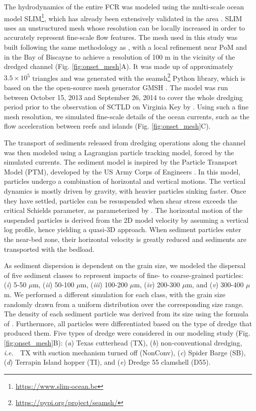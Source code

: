 \documentclass[preprint,12pt,authoryear]{elsarticle}
\newcommand{\ie}{{\it i.e.}\ }
\begin{document}
The hydrodynamics of the entire FCR was modeled using the multi-scale ocean model SLIM\footnote{\url{ https://www.slim-ocean.be}}, which has already been extensively validated in the area \citep{frys2020fine,dobbelaere2020coupled,dobbelaere2022impacts,dobbelaere2022connecting}. SLIM uses an unstructured mesh whose resolution can be locally increased in order to accurately represent fine-scale flow features. The mesh used in this study was built following the same methodology as \cite{dobbelaere2020coupled}, with a local refinement near PoM and in the Bay of Biscayne to achieve a resolution of 100 m in the vicinity of the dredged channel (Fig. \ref{fig:onset_mesh}A). It was made up of approximately $3.5\times 10^5$ triangles and was generated with the seamsh\footnote{\url{https://pypi.org/project/seamsh/}} Python library, which is based on the the open-source mesh generator GMSH \citep{geuzaine2009gmsh}. The model was run between October 15, 2013 and September 26, 2014 to cover the whole dredging period prior to the observation of SCTLD on Virginia Key by \cite{precht2016unprecedented}. Using such a fine mesh resolution, we simulated fine-scale details of the ocean currents, such as the flow acceleration between reefs and islands (Fig. \ref{fig:onset_mesh}C).

The transport of sediments released from dredging operations along the channel was then modeled using a Lagrangian particle tracking model, forced by the simulated currents. The sediment model is inspired by the Particle Transport Model (PTM), developed by the US Army Corps of Engineers \citep{macdonald2006ptm}. In this model, particles undergo a combination of horizontal and vertical motions. The vertical dynamics is mostly driven by gravity, with heavier particles sinking faster. Once they have settled, particles can be resuspended when shear stress exceeds   the critical Schields parameter, as parameterized by \cite{soulsby1997threshold}. The horizontal motion of the suspended particles is derived from the 2D model velocity by assuming a vertical log profile, hence yielding a quasi-3D approach. When sediment particles enter the near-bed zone, their horizontal velocity is greatly reduced and sediments are transported with the bedload.   

As sediment dispersion is dependent on the grain size, we modeled the dispersal of five sediment classes to represent impacts of fine- to coarse-grained particles: (\textit{i}) 5-50 $\mu$m, (\textit{ii}) 50-100 $\mu$m, (\textit{iii}) 100-200 $\mu$m, (\textit{iv}) 200-300 $\mu$m, and (\textit{v}) 300-400 $\mu$m. We performed a  different simulation for each class, with the grain size randomly drawn from a uniform distribution over the corresponding size range. The density of each sediment particle was derived from its size using the formula of \cite{hamilton1982sound}. Furthermore, all particles were differentiated based on the type of dredge that produced them. Five types of dredge were considered in our modeling study (Fig. \ref{fig:onset_mesh}B): (\textit{a}) Texas cutterhead (TX), (\textit{b}) non-conventional dredging, \ie~TX with suction mechanism turned off (NonConv), (\textit{c}) Spider Barge (SB), (\textit{d}) Terrapin Island hopper (TI), and (\textit{e}) Dredge 55 clamshell (D55).
\end{document}
